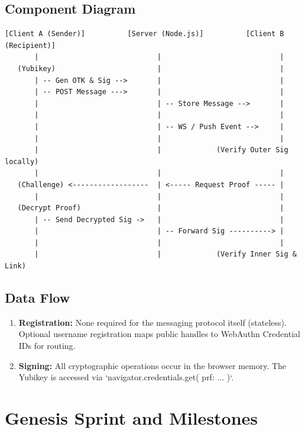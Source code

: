 \documentclass[letterpaper,11pt]{article}
\begin{document}
\subsection{Component Diagram}
\begin{verbatim}
[Client A (Sender)]          [Server (Node.js)]          [Client B (Recipient)]
       |                            |                            |
   (Yubikey)                        |                            |
       | -- Gen OTK & Sig -->       |                            |
       | -- POST Message --->       |                            |
       |                            | -- Store Message -->       |
       |                            |                            |
       |                            | -- WS / Push Event -->     |
       |                            |                            |
       |                            |             (Verify Outer Sig locally)
       |                            |                            |
   (Challenge) <------------------  | <----- Request Proof ----- |
       |                            |                            |
   (Decrypt Proof)                  |                            |
       | -- Send Decrypted Sig ->   |                            |
       |                            | -- Forward Sig ----------> |
       |                            |                            |
       |                            |             (Verify Inner Sig & Link)
\end{verbatim}

\subsection{Data Flow}
\begin{enumerate}
    \item \textbf{Registration:} None required for the messaging protocol itself (stateless). Optional username registration maps public handles to WebAuthn Credential IDs for routing.
    \item \textbf{Signing:} All cryptographic operations occur in the browser memory. The Yubikey is accessed via `navigator.credentials.get({ prf: ... })`.
\end{enumerate}

\section{Genesis Sprint and Milestones}
\end{document}

